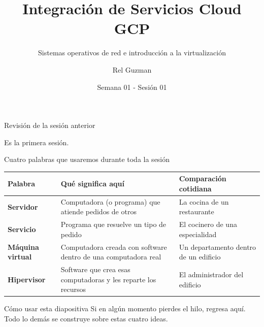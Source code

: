 \documentclass[aspectratio=169,10pt,c]{beamer}
\title{Integración de Servicios Cloud GCP}
\subtitle{Sistemas operativos de red e introducción a la virtualización}
\date{Semana 01 - Sesión 01}
\author{Rel Guzman}
\begin{document}
{\maketitle}

\begin{frame}{Revisión de la sesión anterior}
\begin{center}
\Large Es la primera sesión.
\end{center}
\end{frame}

\begin{frame}{Cuatro palabras que usaremos durante toda la sesión}
\begin{center}
\small
\begin{tabular}{>{\bfseries}p{2.9cm}p{5.4cm}p{3.6cm}}
\toprule
Palabra & Qué significa aquí & Comparación cotidiana \\
\midrule
Servidor & Computadora (o programa) que atiende pedidos de otros & La cocina de un restaurante \\
Servicio & Programa que resuelve un tipo de pedido & El cocinero de una especialidad \\
Máquina virtual & Computadora creada con software dentro de una computadora real & Un departamento dentro de un edificio \\
Hipervisor & Software que crea esas computadoras y les reparte los recursos & El administrador del edificio \\
\bottomrule
\end{tabular}
\end{center}
\vspace{0.15cm}
\begin{block}{Cómo usar esta diapositiva}
\small Si en algún momento pierdes el hilo, regresa aquí. Todo lo demás se construye sobre estas cuatro ideas.
\end{block}
\end{frame}
\end{document}

